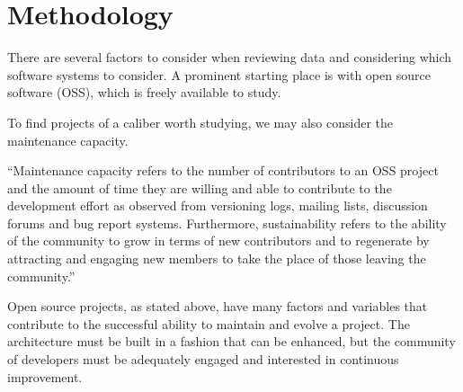 \chapter{Methodology} \label{chapterMethodology}


There are several factors to consider when reviewing data and considering which software systems to consider. A prominent starting place is with open source software (OSS), which is freely available to study.

To find projects of a caliber worth studying, we may also consider the maintenance capacity.

\vspace{0.25cm}
\begin{displayquote}
  ``Maintenance capacity refers to the number of contributors to an OSS project and the amount of time they are willing and able to contribute to the development effort as observed from versioning logs, mailing lists, discussion forums and bug report systems. Furthermore, sustainability refers to the ability of the community to grow in terms of new contributors and to regenerate by attracting and engaging new members to take the place of those leaving the community.'' \cite{adewumi:2016}
\end{displayquote}
\vspace{0.25cm}

Open source projects, as stated above, have many factors and variables that contribute to the successful ability to maintain and evolve a project. The architecture must be built in a fashion that can be enhanced, but the community of developers must be adequately engaged and interested in continuous improvement.
